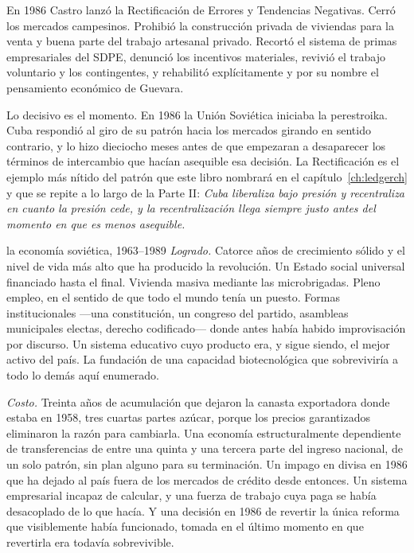 En 1986 Castro lanzó la Rectificación de Errores y Tendencias Negativas. Cerró
los mercados campesinos. Prohibió la construcción privada de viviendas para la
venta y buena parte del trabajo artesanal privado. Recortó el sistema de primas
empresariales del SDPE, denunció los incentivos materiales, revivió el trabajo
voluntario y los contingentes, y rehabilitó explícitamente y por su nombre el
pensamiento económico de Guevara.

Lo decisivo es el momento. En 1986 la Unión Soviética iniciaba la perestroika.
Cuba respondió al giro de su patrón hacia los mercados girando en sentido
contrario, y lo hizo dieciocho meses antes de que empezaran a desaparecer los
términos de intercambio que hacían asequible esa decisión. La Rectificación es el
ejemplo más nítido del patrón que este libro nombrará en el
capítulo~\ref{ch:ledgerch} y que se repite a lo largo de la Parte II: \emph{Cuba
liberaliza bajo presión y recentraliza en cuanto la presión cede, y la
recentralización llega siempre justo antes del momento en que es menos
asequible.}

\begin{ledger}{la economía soviética, 1963--1989}
\emph{Logrado.} Catorce años de crecimiento sólido y el nivel de vida más alto
que ha producido la revolución. Un Estado social universal financiado hasta el
final. Vivienda masiva mediante las microbrigadas. Pleno empleo, en el sentido de
que todo el mundo tenía un puesto. Formas institucionales ---una constitución, un
congreso del partido, asambleas municipales electas, derecho codificado--- donde
antes había habido improvisación por discurso. Un sistema educativo cuyo producto
era, y sigue siendo, el mejor activo del país. La fundación de una capacidad
biotecnológica que sobreviviría a todo lo demás aquí enumerado.

\emph{Costo.} Treinta años de acumulación que dejaron la canasta exportadora
donde estaba en 1958, tres cuartas partes azúcar, porque los precios garantizados
eliminaron la razón para cambiarla. Una economía estructuralmente dependiente de
transferencias de entre una quinta y una tercera parte del ingreso nacional, de un
solo patrón, sin plan alguno para su terminación. Un impago en divisa en 1986 que
ha dejado al país fuera de los mercados de crédito desde entonces. Un sistema
empresarial incapaz de calcular, y una fuerza de trabajo cuya paga se había
desacoplado de lo que hacía. Y una decisión en 1986 de revertir la única reforma
que visiblemente había funcionado, tomada en el último momento en que revertirla
era todavía sobrevivible.
\end{ledger}
